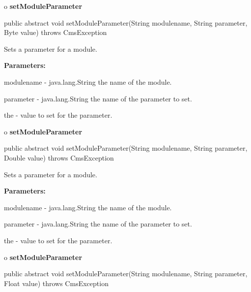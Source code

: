o {\bf setModuleParameter} 

\begin{PRE}
 public abstract void setModuleParameter(String modulename,
                                         String parameter,
                                         Byte value) throws CmsException
\end{PRE}

\begin{description}
\htmlDD Sets a parameter for a module. 

\begin{description}
\item {\bf Parameters:}  

modulename - java.lang.String the name of the module.  

parameter - java.lang.String the name of the parameter to set.  

the - value to set for the parameter.  
\end{description}

\end{description}

o {\bf setModuleParameter} 

\begin{PRE}
 public abstract void setModuleParameter(String modulename,
                                         String parameter,
                                         Double value) throws CmsException
\end{PRE}

\begin{description}
\htmlDD Sets a parameter for a module. 

\begin{description}
\item {\bf Parameters:}  

modulename - java.lang.String the name of the module.  

parameter - java.lang.String the name of the parameter to set.  

the - value to set for the parameter.  
\end{description}

\end{description}

o {\bf setModuleParameter} 

\begin{PRE}
 public abstract void setModuleParameter(String modulename,
                                         String parameter,
                                         Float value) throws CmsException
\end{PRE}

